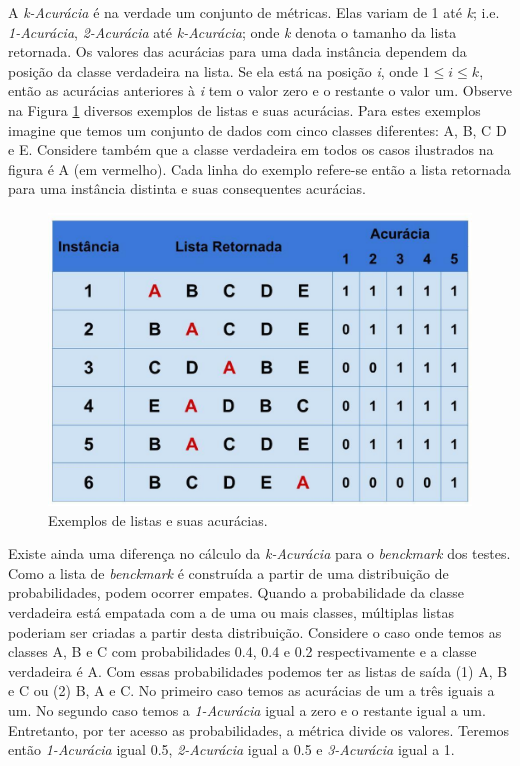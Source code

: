 A \textit{k-Acurácia} é na verdade um conjunto de métricas. 
Elas variam de 1 até \textit{k}; i.e. \textit{1-Acurácia}, \textit{2-Acurácia} até \textit{k-Acurácia}; onde \textit{k} denota o tamanho da lista retornada.
Os valores das acurácias para uma dada instância dependem da posição da classe verdadeira na lista.
Se ela está na posição \textit{i}, onde $1 \leq \textit{i} \leq \textit{k}$, então as acurácias anteriores à \textit{i} tem o valor zero e o restante o valor um.
Observe na Figura \ref{fig:descricaodostestes01} diversos exemplos de listas e suas acurácias.
Para estes exemplos imagine que temos um conjunto de dados com cinco classes diferentes: A, B, C D e E.
Considere também que a classe verdadeira em todos os casos ilustrados na figura é A (em vermelho).
Cada linha do exemplo refere-se então a lista retornada para uma instância distinta e suas consequentes acurácias.

\begin{figure}[h!]
  \includegraphics[width=\linewidth]{images/descricaodostestes01.eps}
  \caption{Exemplos de listas e suas acurácias.}
  \label{fig:descricaodostestes01}
\end{figure}



Existe ainda uma diferença no cálculo da \textit{k-Acurácia} para o \textit{benckmark} dos testes.
Como a lista de \textit{benckmark} é construída a partir de uma distribuição de probabilidades, podem ocorrer empates.
Quando a probabilidade da classe verdadeira está empatada com a de uma ou mais classes, múltiplas listas poderiam ser criadas a partir desta distribuição.
Considere o caso onde temos as classes A, B e C com probabilidades 0.4, 0.4 e 0.2 respectivamente e a classe verdadeira é A.
Com essas probabilidades podemos ter as listas de saída (1) A, B e C ou (2) B, A e C.
No primeiro caso temos as acurácias de um a três iguais a um.
No segundo caso temos a \textit{1-Acurácia} igual a zero e o restante igual a um.
Entretanto, por ter acesso as probabilidades, a métrica divide os valores.
Teremos então \textit{1-Acurácia} igual 0.5, \textit{2-Acurácia} igual a 0.5 e \textit{3-Acurácia} igual a 1.

